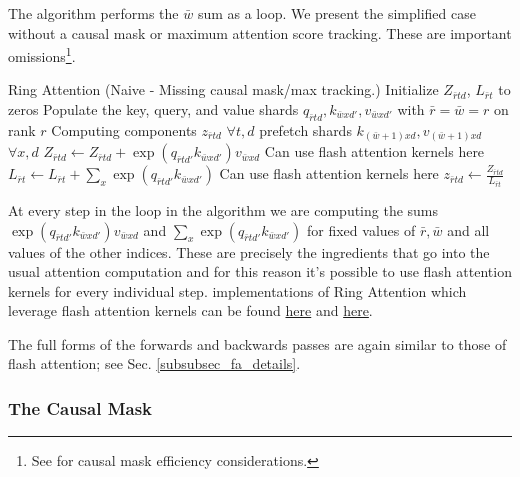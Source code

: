 The algorithm performs the $ \bar{w}$ sum as a loop. We present the simplified case without a causal
mask or maximum attention score tracking. These are important omissions\footnote{See
\cite{brandon2023stripedattentionfasterring} for causal mask efficiency considerations.}.
\begin{algo}{Ring Attention (Naive - Missing causal mask/max tracking.)}
\State Initialize $ Z _{ \bar{r}td } $, $ L _{ \bar{r}t } $ to zeros
\State Populate the key, query, and value shards $ q _{ \bar{r}td },k _{ \bar{w}x d' },v _{ \bar{w}x d' } $ with $ \bar{r} =  \bar{w} = r $ on rank $ r $
 \Comment Computing components $ z _{ \bar{r}td } $ $ \forall t, d $
     prefetch shards $ k _{ (\bar{w}+1)xd }, v _{ (\bar{w}+1)xd } $ $ \forall x,d $
    \EndIf
    \State $ Z _{ \bar{r}td } \gets Z _{ \bar{r}td }+   \exp \left ( q _{ \bar{r}t d' } k _{ \bar{w}x d' } \right ) v _{ \bar{w}xd } $ \Comment Can use flash attention kernels here
    \State $ L _{ \bar{r}t } \gets  L _{ \bar{r}t } +  \sum _{ x } \exp \left ( q _{ \bar{r}t d' } k _{ \bar{w}x d' }\right )  $ \Comment Can use flash attention kernels here
\EndFor
\State $ z _{ \bar{r}td } \gets \frac{ Z _{ \bar{r}td } }{ L _{ \bar{r}t }  }$
\label{algo_ring_attn_fwd_naive}
\end{algo}

At every step in the loop in the algorithm we are computing the sums $ \exp \left ( q _{ \bar{r}t d'
} k _{ \bar{w}x d' } \right ) v _{ \bar{w}xd } $ and $ \sum _{ x } \exp \left ( q _{ \bar{r}t d' } k
_{ \bar{w}x d' } \right)  $ for fixed values of $ \bar{r}, \bar{w} $ and all values of the other
indices. These are precisely the ingredients that go into the usual attention computation and for
this reason it's possible to use flash attention kernels for every individual step. 
implementations of Ring Attention which leverage flash attention kernels can be found
\href{https://github.com/lucidrains/ring-attention-pytorch}{here} and
\href{https://github.com/zhuzilin/ring-flash-attention}{here}.

The full forms of the forwards and backwards passes are again similar to those of flash attention; see Sec. \ref{subsubsec_fa_details}.

\subsubsection{The Causal Mask}

